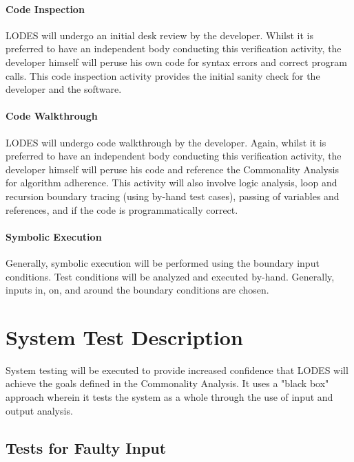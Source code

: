 \documentclass[12pt, titlepage]{article}
\newcommand{\famname}{LODES} %
\begin{document}
\paragraph{Code Inspection\\}
\famname{} will undergo an initial desk review by the developer. Whilst it is preferred to have an independent body conducting this verification activity, the developer himself will peruse his own code for syntax errors and correct program calls. This code inspection activity provides the initial sanity check for the developer and the software.

\paragraph{Code Walkthrough\\}
\famname{} will undergo code walkthrough by the developer. Again, whilst it is preferred to have an independent body conducting this verification activity, the developer himself will peruse his code and reference the Commonality Analysis for algorithm adherence. This activity will also involve logic analysis, loop and recursion boundary tracing (using by-hand test cases), passing of variables and references, and if the code is programmatically correct.

\paragraph{Symbolic Execution\\}
Generally, symbolic execution will be performed using the boundary input conditions. Test conditions will be analyzed and executed by-hand. Generally, inputs in, on, and around the boundary conditions are chosen.


\section{System Test Description}
System testing will be executed to provide increased confidence that \famname{} will achieve the goals defined in the Commonality Analysis. It uses a "black box" approach wherein it tests the system as a whole through the use of input and output analysis.

\subsection{Tests for Faulty Input}
\end{document}
